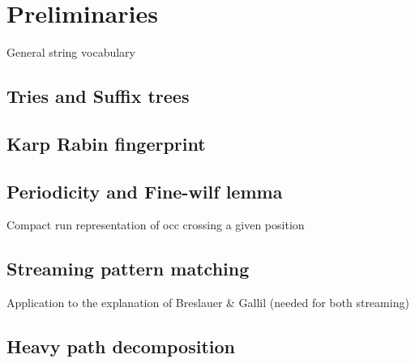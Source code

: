 \chapter*{Preliminaries}

General string vocabulary
\section{Tries and Suffix trees}
\section{Karp Rabin fingerprint} 
\section{Periodicity and Fine-wilf lemma}
Compact run representation of occ crossing a given position

\section{Streaming pattern matching}
Application to the explanation of Breslauer \& Gallil (needed for both streaming)

\section{Heavy path decomposition}